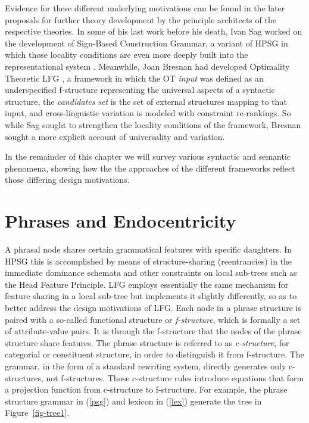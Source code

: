 Evidence for these different underlying motivations can be found in the later proposals for further theory development by the principle architects of the respective theories.  In some of his last work before his death, Ivan Sag worked on the development of Sign-Based Construction Grammar, a variant of HPSG in which those locality conditions are even more deeply built into the representational system \citep{BS2012a-ed}.  Meanwhile, Joan Bresnan had developed Optimality Theoretic LFG \citep{Bresnan97e}, a framework in which the OT \textit{input} was defined as an underspecified f-structure representing the universal aspects of a syntactic structure, the \textit{candidates set} is the set of external structures mapping to that input, and cross-linguistic variation is modeled with constraint re-rankings.  So while Sag sought to strengthen the locality conditions of the framework, Bresnan sought a more explicit account of universality and variation.  

In the remainder of this chapter we will survey various syntactic and semantic phenomena, showing how the the approaches of the different frameworks reflect those differing design motivations.  

\section{Phrases and Endocentricity} 
A phrasal node shares certain grammatical features with specific daughters. %
In HPSG this is accomplished
by means of structure-sharing (reentrancies) in the immediate dominance schemata and other 
constraints on local sub-trees such as the Head Feature Principle.  LFG employs essentially the same mechanism for feature sharing in a local sub-tree but implements it slightly differently, so as to better address the design motivations of LFG.  Each node in a phrase structure is paired with a so-called functional structure or \textit{f-structure}, which is formally a set of attribute-value pairs.  It is through the f-structure that the nodes of the phrase structure share features.   The phrase structure is referred to as \textit{c-structure}, for categorial or constituent structure, in order to distinguish it from f-structure.  The grammar, in the form of a standard rewriting system, directly generates only c-structures, not f-structures.   Those c-structure rules introduce equations that form a projection function from c-structure to f-structure.  For example, the phrase structure grammar in (\ref{psg}) and lexicon in (\ref{lex}) generate the tree in Figure~\ref{fig-tree1}.  

